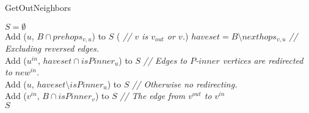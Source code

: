 \begin{algorithm}[t]
    \caption{GetOutNeighbors}
    \label{alg:get_nbr}
    $S = \emptyset$ \\ %
    {
        {
            Add ($u$, $B \cap prehops_{v, u}$) to $S$ 
        }
    }
    \Else(\textit{\color{gray} // $v$ is $v_{out}$ or $v$.})
    {
       {
            $haveset = B \setminus nexthops_{v, u}$ \textit{\color{gray} // Excluding reversed edges.}\\
            Add ($u^{in}$, $haveset \cap isPinner_u$) to $S$ \textit{\color{gray} // Edges to $P$-$inner$ vertices are redirected to $new^{in}$.} \\
            Add ($u$, $haveset \setminus isPinner_u$) to $S$ 
            \textit{\color{gray} // Otherwise no redirecting.} 
            \\
        }
        Add ($v^{in}$, $B \cap isPinner_v$) to $S$ 
        \textit{\color{gray} // The edge from $v^{out}$ to $v^{in}$}
        \\
    }
    \Return $S$\\
\end{algorithm}

